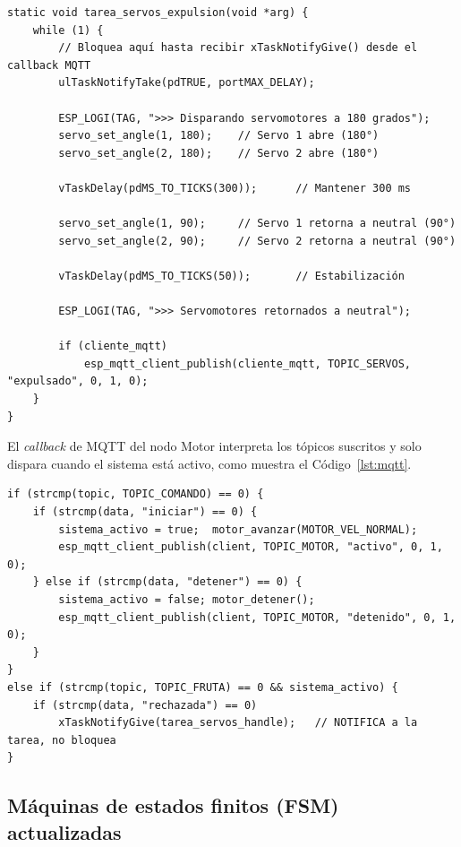 \documentclass[12pt]{catolica_proyectos}
\begin{document}
\begin{lstlisting}[style=C, caption={Tarea FreeRTOS de los servomotores: espera una notificación, gira a 180°, retorna a neutral y confirma por MQTT, sin bloquear el hilo del broker.}, label={lst:servos}]
static void tarea_servos_expulsion(void *arg) {
    while (1) {
        // Bloquea aquí hasta recibir xTaskNotifyGive() desde el callback MQTT
        ulTaskNotifyTake(pdTRUE, portMAX_DELAY);

        ESP_LOGI(TAG, ">>> Disparando servomotores a 180 grados");
        servo_set_angle(1, 180);    // Servo 1 abre (180°)
        servo_set_angle(2, 180);    // Servo 2 abre (180°)
        
        vTaskDelay(pdMS_TO_TICKS(300));      // Mantener 300 ms
        
        servo_set_angle(1, 90);     // Servo 1 retorna a neutral (90°)
        servo_set_angle(2, 90);     // Servo 2 retorna a neutral (90°)
        
        vTaskDelay(pdMS_TO_TICKS(50));       // Estabilización

        ESP_LOGI(TAG, ">>> Servomotores retornados a neutral");

        if (cliente_mqtt)
            esp_mqtt_client_publish(cliente_mqtt, TOPIC_SERVOS, "expulsado", 0, 1, 0);
    }
}
\end{lstlisting}

El \emph{callback} de MQTT del nodo Motor interpreta los tópicos suscritos y solo dispara cuando el sistema está activo, como muestra el Código~\ref{lst:mqtt}.

\begin{lstlisting}[style=C, caption={Manejo de eventos MQTT en el nodo Motor (caso de datos recibidos con servomotores).}, label={lst:mqtt}]
if (strcmp(topic, TOPIC_COMANDO) == 0) {
    if (strcmp(data, "iniciar") == 0) {
        sistema_activo = true;  motor_avanzar(MOTOR_VEL_NORMAL);
        esp_mqtt_client_publish(client, TOPIC_MOTOR, "activo", 0, 1, 0);
    } else if (strcmp(data, "detener") == 0) {
        sistema_activo = false; motor_detener();
        esp_mqtt_client_publish(client, TOPIC_MOTOR, "detenido", 0, 1, 0);
    }
}
else if (strcmp(topic, TOPIC_FRUTA) == 0 && sistema_activo) {
    if (strcmp(data, "rechazada") == 0)
        xTaskNotifyGive(tarea_servos_handle);   // NOTIFICA a la tarea, no bloquea
}
\end{lstlisting}

\subsection{Máquinas de estados finitos (FSM) actualizadas}
\end{document}
